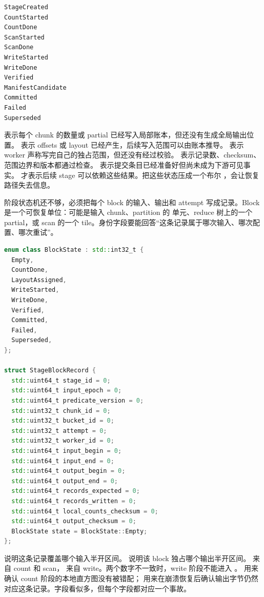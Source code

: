 \begin{lstlisting}[numbers=none,caption={stable filter 或 partition 的阶段状态机}]
StageCreated
CountStarted
CountDone
ScanStarted
ScanDone
WriteStarted
WriteDone
Verified
ManifestCandidate
Committed
Failed
Superseded
\end{lstlisting}

 表示每个 chunk 的数量或 partial 已经写入局部账本，但还没有生成全局输出位置。 表示 offsets 或 layout 已经产生，后续写入范围可以由账本推导。 表示 worker 声称写完自己的独占范围，但还没有经过校验。 表示记录数、checksum、范围边界和版本都通过检查。 表示提交条目已经准备好但尚未成为下游可见事实。 才表示后续 stage 可以依赖这些结果。把这些状态压成一个布尔 ，会让恢复路径失去信息。

阶段状态机还不够，必须把每个 block 的输入、输出和 attempt 写成记录。Block 是一个可恢复单位：可能是输入 chunk、partition 的  单元、reduce 树上的一个 partial，或 scan 的一个 tile。身份字段要能回答“这条记录属于哪次输入、哪次配置、哪次重试”。

\begin{lstlisting}[language=C++,caption={可恢复并行 stage 的 block 记录}]
enum class BlockState : std::int32_t {
  Empty,
  CountDone,
  LayoutAssigned,
  WriteStarted,
  WriteDone,
  Verified,
  Committed,
  Failed,
  Superseded,
};

struct StageBlockRecord {
  std::uint64_t stage_id = 0;
  std::uint64_t input_epoch = 0;
  std::uint64_t predicate_version = 0;
  std::uint32_t chunk_id = 0;
  std::uint32_t bucket_id = 0;
  std::uint32_t attempt = 0;
  std::uint32_t worker_id = 0;
  std::uint64_t input_begin = 0;
  std::uint64_t input_end = 0;
  std::uint64_t output_begin = 0;
  std::uint64_t output_end = 0;
  std::uint64_t records_expected = 0;
  std::uint64_t records_written = 0;
  std::uint64_t local_counts_checksum = 0;
  std::uint64_t output_checksum = 0;
  BlockState state = BlockState::Empty;
};
\end{lstlisting}

 说明这条记录覆盖哪个输入半开区间。 说明该 block 独占哪个输出半开区间。 来自 count 和 scan， 来自 write。两个数字不一致时，write 阶段不能进入 。 用来确认 count 阶段的本地直方图没有被错配； 用来在崩溃恢复后确认输出字节仍然对应这条记录。字段看似多，但每个字段都对应一个事故。

